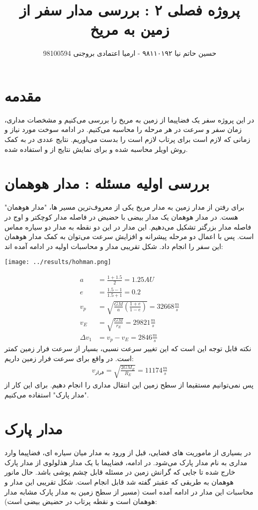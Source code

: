 \documentclass[12pt]{article}
\title{پروژه فصلی ۲ : بررسی مدار سفر از زمین به مریخ}
\author{حسین حاتم نیا ۹۸۱۱۰۱۹۲ - ارمیا اعتمادی بروجنی 98100594}
\date{}
\begin{document}
	\maketitle
	\section*{مقدمه}
	در این پروژه سفر یک فضاپیما از زمین به مریخ را بررسی می‌کنیم و مشخصات مداری، زمان سفر و سرعت در هر مرحله را محاسبه می‌کنیم. در ادامه سوخت مورد نیاز و زمانی که لازم است برای پرتاب لازم است را بدست می‌اوریم. نتایج عددی در   به کمک روش اویلر محاسبه شده و برای نمایش نتایج از  و  استفاده شده. 
	\section*{بررسی اولیه مسئله : مدار هوهمان}
	برای رفتن از مدار زمین به مدار مریخ یکی از معروف‌‌ترین مسیر ها، "مدار هوهمان" هست. در مدار هوهمان یک مدار بیضی با حضیض در فاصله مدار کوچکتر و اوج در فاصله مدار بزرگتر تشکیل می‌دهیم. این مدار در این دو نقطه به مدار دو سیاره مماس است. پس با اعمال دو مرحله پیشرانه و افزایش سرعت می‌توان به کمک مدار هوهمان این سفر را انجام داد. شکل تقریبی مدار و محاسبات اولیه در ادامه آمده اند:
	
	\texttt{[image: ../results/hohman.png]}
	
	\begin{align}
	a &= \frac{1 + 1.5}{2} = 1.25 AU \\
	e &= \frac{1.5 - 1}{1.5 + 1} = 0.2 \\
	v_p &= \sqrt{\frac{GM}{a}\left (\frac{1+e}{1-e}\right)} = 32668 \frac{m}{s} \\
	v_E &= \sqrt{\frac{GM}{r_E}} = 29821 \frac{m}{s} \\
	\Delta v_1 &= v_p - v_E = 2846 \frac{m}{s}
	\end{align}
	نکته قابل توجه این است که این تغییر سرعت نسبی، بسیار از سرعت فرار زمین کمتر است. در واقع برای سرعت فرار زمین داریم:
	\begin{align}
	v_{\text{فرار}} = \sqrt{\frac{2GM_E}{R_E}} = 11174 \frac{m}{s}
	\end{align}
	پس نمی‌توانیم مستقیما از سطح زمین این انتقال مداری را انجام دهیم. برای این کار از "مدار پارک" استفاده می‌کنیم.
	
	\section*{مدار پارک}
	در بسیاری از ماموریت های فضایی، قبل از ورود به مدار میان سیاره ای، فضاپیما وارد مداری به نام مدار پارک می‌شود. در ادامه، فضاپیما با یک مدار هذلولوی از مدار پارک خارج شده تا جایی که گرانش زمین در مسئله قابل چشم پوشی باشد. حال مانور هوهمان به طریقی که عقبتر گفته شد قابل انجام است. شکل تقریبی این مدار و محاسبات این مدار در ادامه آمده است (مسیر از سطح زمین به مدار پارک مشابه مدار هوهمان است و نقطه پرتاب در حضیض بیضی است):
	
\end{document}

